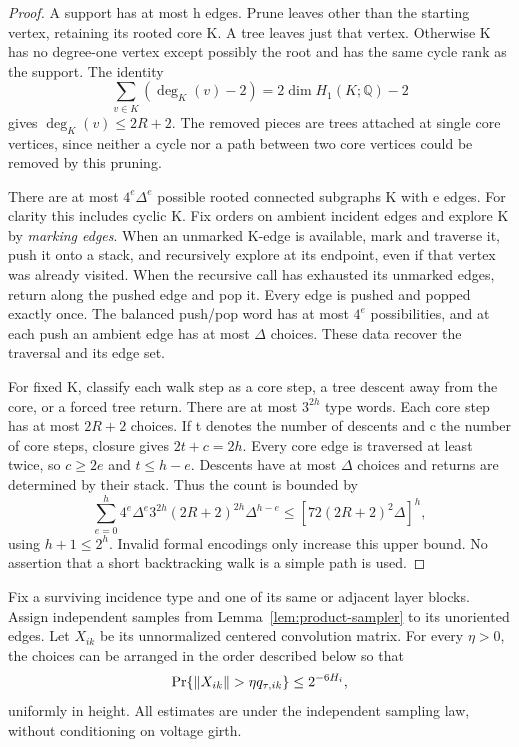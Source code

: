 \begin{proof}
A support has at most h edges.  Prune leaves other than the starting vertex,
retaining its rooted core K.  A tree leaves just that vertex.  Otherwise K
has no degree-one vertex except possibly the root and has the same cycle
rank as the support.  The identity
\[
 \sum_{v\in K}(\deg_K(v)-2)=2\dim H_1(K;\mathbb Q)-2
\]
gives \(\deg_K(v)\leq2R+2\).  The removed pieces are trees attached at single
core vertices, since neither a cycle nor a path between two core vertices
could be removed by this pruning.

There are at most \(4^e\Delta^e\) possible rooted connected subgraphs K with
e edges.  For clarity this includes cyclic K.  Fix orders on ambient incident
edges and explore K by \emph{marking edges}.  When an unmarked K-edge is
available, mark and traverse it, push it onto a stack, and recursively explore
at its endpoint, even if that vertex was already visited.  When the recursive
call has exhausted its unmarked edges, return along the pushed edge and pop
it.  Every edge is pushed and popped exactly once.  The balanced push/pop word
has at most \(4^e\) possibilities, and at each push an ambient edge has at
most \(\Delta\) choices.  These data recover the traversal and its edge set.

For fixed K, classify each walk step as a core step, a tree descent away from
the core, or a forced tree return.  There are at most \(3^{2h}\) type words.
Each core step has at most \(2R+2\) choices.  If t denotes the number of
descents and c the number of core steps, closure gives \(2t+c=2h\).  Every
core edge is traversed at least twice, so \(c\geq2e\) and \(t\leq h-e\).
Descents have at most \(\Delta\) choices and returns are determined by their
stack.  Thus the count is bounded by
\[
 \sum_{e=0}^h4^e\Delta^e3^{2h}(2R+2)^{2h}\Delta^{h-e}
 \leq[72(2R+2)^2\Delta]^h,
\]
using \(h+1\leq2^h\).  Invalid formal encodings only increase this upper
bound.  No assertion that a short backtracking walk is a simple path is used.
\end{proof}

\begin{lemma}
\label{lem:centered-voltage-block}
Fix a surviving incidence type and one of its same or adjacent layer blocks.
Assign independent samples from Lemma~\ref{lem:product-sampler} to its
unoriented edges.  Let \(X_{ik}\) be its unnormalized centered convolution
matrix.  For every \(\eta>0\), the choices can be arranged in the order
described below so that
\begin{equation}
\label{eq:centered-block-tail}
 \Pr\{\left\lVert X_{ik}\right\rVert>\eta q_{\tau,ik}\}\leq2^{-6H_i},
\end{equation}
uniformly in height.  All estimates are under the independent sampling law,
without conditioning on voltage girth.
\end{lemma}

